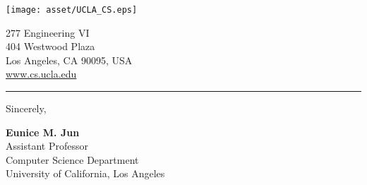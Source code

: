 \documentclass[12pt, a4paper, hidelinks]{letter} %
\begin{document}
\begin{minipage}{0.6\textwidth}
\vspace{-17mm}
\texttt{[image: asset/UCLA\_CS.eps]}\\
\end{minipage}
\hfill
\begin{minipage}{0.3\textwidth}\raggedright
\vspace{-20mm}
\footnotesize{
277 Engineering VI\\
404 Westwood Plaza\\
Los Angeles, CA 90095, USA \\
\url{www.cs.ucla.edu}}
\end{minipage}
\hrule
\vspace{3mm}
\rightline{\today}






\vspace{+2mm}
Sincerely,

\vspace{+2mm}
\vspace{+2mm}
\vspace{+2mm}



\textbf{Eunice M. Jun}\\
Assistant Professor\\
Computer Science Department \\
University of California, Los Angeles
\end{document}
